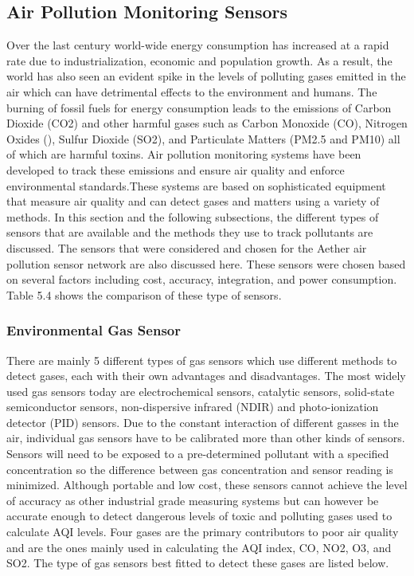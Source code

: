 \subsection{Air Pollution Monitoring Sensors}
Over the last century world-wide energy consumption has increased at a rapid rate due to industrialization, economic and population growth. As a result, the world has also seen an evident spike in the levels of polluting gases emitted in the air which can have detrimental effects to the environment and humans. The burning of fossil fuels for energy consumption leads to the emissions of Carbon Dioxide (CO2) and other harmful gases such as Carbon Monoxide (CO), Nitrogen Oxides (\nox), Sulfur Dioxide (SO2), and Particulate Matters (PM2.5 and PM10) all of which are harmful toxins. Air pollution monitoring systems have been developed to track these emissions and ensure air quality and enforce environmental standards.These systems are based on sophisticated equipment that measure air quality and can detect gases and matters using a variety of methods. In this section and the following subsections, the different types of sensors that are available and the methods they use to track pollutants are discussed. The sensors that were considered and chosen for the Aether air pollution sensor network are also discussed here. These sensors were chosen based on several factors including cost, accuracy, integration, and power consumption. Table 5.4 shows the comparison of these type of sensors.


\subsubsection{Environmental Gas Sensor}
There are mainly 5 different types of gas sensors which use different methods to detect gases, each with their own advantages and disadvantages. The most widely used gas sensors today are electrochemical sensors, catalytic sensors, solid-state semiconductor sensors, non-dispersive infrared (NDIR) and photo-ionization detector (PID) sensors. Due to the constant interaction of different gasses in the air, individual gas sensors have to be calibrated more than other kinds of sensors. Sensors will need to be exposed to a pre-determined pollutant with a specified concentration so the difference between gas concentration and sensor reading is minimized. Although portable and low cost, these sensors cannot achieve the level of accuracy as other industrial grade measuring systems but can however be accurate enough to detect dangerous levels of toxic and polluting gases used to calculate AQI levels. Four gases are the primary contributors to poor air quality and are the ones mainly used in calculating the AQI index, CO, NO2, O3, and SO2. The type of gas sensors best fitted to detect these gases are listed below. 

